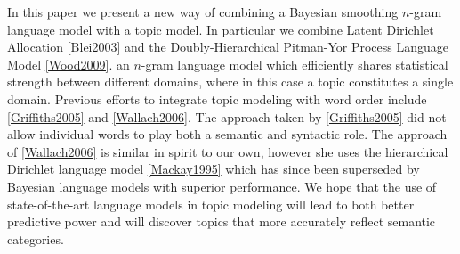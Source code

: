 


In this paper we present a new way of combining a Bayesian smoothing $n$-gram language model with a topic model.  In particular we combine Latent Dirichlet Allocation \ref{Blei2003} and the Doubly-Hierarchical Pitman-Yor Process Language Model \ref{Wood2009}.   an $n$-gram language model which efficiently shares statistical strength between different domains, where in this case a topic constitutes a single domain.  Previous efforts to integrate topic modeling with word order include \ref{Griffiths2005} and \ref{Wallach2006}.  The approach taken by \ref{Griffiths2005} did not allow individual words to play both a semantic and syntactic role.  The approach of \ref{Wallach2006} is similar in spirit to our own, however she uses the hierarchical Dirichlet language model \ref{Mackay1995} which has since been superseded by Bayesian language models with superior performance.  We hope that the use of state-of-the-art language models in topic modeling will lead to both better predictive power and will discover topics that more accurately reflect semantic categories.
